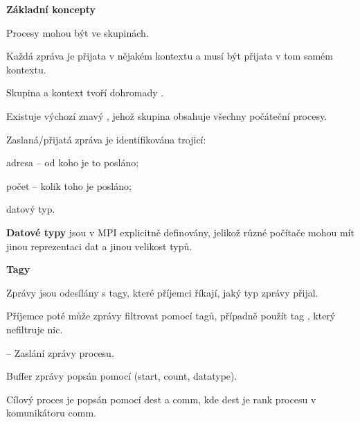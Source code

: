 \begin{compactitem}
    \item \textbf{Základní koncepty} \begin{compactitem}
        \item Procesy mohou být ve skupinách.
        \item Každá zpráva je přijata v nějakém kontextu a musí být přijata v tom samém kontextu.
        \item Skupina a kontext tvoří dohromady .
        \item Existuje výchozí  znavý , jehož skupina obsahuje všechny počáteční procesy.
    \end{compactitem}

    \item Zaslaná/přijatá zpráva je identifikována trojicí: \begin{compactitem}
        \item adresa -- od koho je to posláno;
        \item počet -- kolik toho je posláno;
        \item datový typ.
    \end{compactitem}

    \item \textbf{Datové typy} jsou v MPI explicitně definovány, jelikož různé počítače mohou mít jinou reprezentaci dat a jinou velikost typů.

    \item \textbf{Tagy} \begin{compactitem}
        \item Zprávy jsou odesílány s tagy, které příjemci říkají, jaký typ zprávy přijal.

        \item Příjemce poté může zprávy filtrovat pomocí tagů, případně použít tag \break {}, který nefiltruje nic.
    \end{compactitem}

    \item {} -- Zaslání zprávy procesu. \begin{compactitem}
        \item Buffer zprávy popsán pomocí (start, count, datatype).

        \item Cílový proces je popsán pomocí dest a comm, kde dest je rank procesu v komunikátoru comm.


\end{compactitem}
\end{compactitem}
